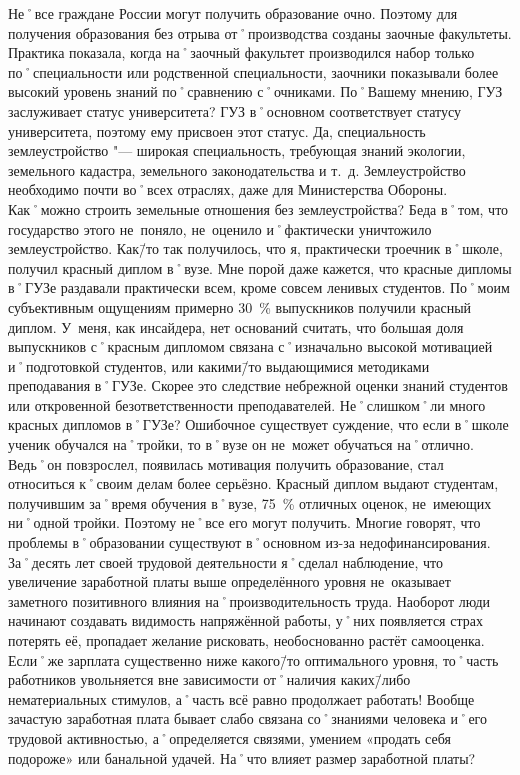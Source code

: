 \begin{drama}
	\michaelspeaks Не˚все граждане России могут получить образование очно. Поэтому для получения образования без отрыва от˚производства созданы заочные факультеты. Практика показала, когда на˚заочный факультет производился набор только по˚специальности или родственной специальности, заочники показывали более высокий уровень знаний по˚сравнению с˚очниками.
	\maxspeaks По˚Вашему мнению, ГУЗ заслуживает статус университета?
	\michaelspeaks ГУЗ в˚основном соответствует статусу университета, поэтому ему присвоен этот статус. Да, специальность землеустройство "--- широкая специальность, требующая знаний экологии, земельного кадастра, земельного законодательства и т.~д. Землеустройство необходимо почти во˚всех отраслях, даже для Министерства Обороны. Как˚можно строить земельные отношения без землеустройства? Беда в˚том, что государство этого не~поняло, не~оценило и˚фактически уничтожило землеустройство.
	\maxspeaks Как\=/то так получилось, что я, практически троечник в˚школе, получил красный диплом в˚вузе. Мне порой даже кажется, что красные дипломы в˚ГУЗе раздавали практически всем, кроме совсем ленивых студентов. По˚моим субъективным ощущениям примерно 30~\% выпускников получили красный диплом. У~меня, как инсайдера, нет оснований считать, что большая доля выпускников с˚красным дипломом связана с˚изначально высокой мотивацией и˚подготовкой студентов, или какими\=/то выдающимися методиками преподавания в˚ГУЗе. Скорее это следствие небрежной оценки знаний студентов или откровенной безответственности преподавателей. Не˚слишком˚ли много красных дипломов в˚ГУЗе?
	\michaelspeaks Ошибочное существует суждение, что если в˚школе ученик обучался на˚тройки, то в˚вузе он не~может обучаться на˚отлично. Ведь˚он повзрослел, появилась мотивация получить образование, стал относиться к˚своим делам более серьёзно. Красный диплом выдают студентам, получившим за˚время обучения в˚вузе, 75~\% отличных оценок, не~имеющих ни˚одной тройки. Поэтому не˚все его могут получить.
	\maxspeaks Многие говорят, что проблемы в˚образовании существуют в˚основном из-за недофинансирования. За˚десять лет своей трудовой деятельности я˚сделал наблюдение, что увеличение заработной платы выше определённого уровня не~оказывает заметного позитивного влияния на˚производительность труда. Наоборот люди начинают создавать видимость напряжённой работы, у˚них появляется страх потерять её, пропадает желание рисковать, необоснованно растёт самооценка. Если˚же зарплата существенно ниже какого\=/то оптимального уровня, то˚часть работников увольняется вне зависимости от˚наличия каких\=/либо нематериальных стимулов, а˚часть всё равно продолжает работать! Вообще зачастую заработная плата бывает слабо связана со˚знаниями человека и˚его трудовой активностью, а˚определяется связями, умением  «продать себя подороже» или банальной удачей. На˚что влияет размер заработной платы?

\end{drama}
